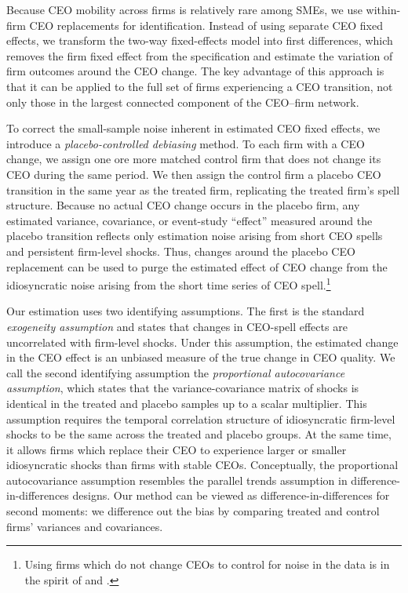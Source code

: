 \documentclass[sigconf,nonacm]{acmart}
\begin{document}
Because CEO mobility across firms is relatively rare among SMEs, we use within-firm CEO replacements for identification. Instead of using separate CEO fixed effects, we transform the two-way fixed-effects model into first differences, which removes the firm fixed effect from the specification and estimate the variation of firm outcomes around the CEO change. The key advantage of this approach is that it can be applied to the full set of firms experiencing a CEO transition, not only those in the largest connected component of the CEO–firm network.

To correct the small-sample noise inherent in estimated CEO fixed effects, we introduce a \textit{placebo-controlled debiasing} method. To each firm with a CEO change, we assign one ore more matched control firm that does not change its CEO during the same period. We then assign the control firm a placebo CEO transition in the same year as the treated firm, replicating the treated firm's spell structure. Because no actual CEO change occurs in the placebo firm, any estimated variance, covariance, or event-study ``effect'' measured around the placebo transition reflects only estimation noise arising from short CEO spells and persistent firm-level shocks. Thus, changes around the placebo CEO replacement can be used to purge the estimated effect of CEO change from the idiosyncratic noise arising from the short time series of CEO spell.\footnote{Using firms which do not change CEOs to control for noise in the data is in the spirit of \cite{fitza2014use} and \cite{jarosiewicz2023revisiting}.}

Our estimation uses two identifying assumptions. The first is the standard \textit{exogeneity assumption} and states that changes in CEO-spell effects are uncorrelated with firm-level shocks. Under this assumption, the estimated change in the CEO effect is an unbiased measure of the true change in CEO quality. We call the second identifying assumption the \textit{proportional autocovariance assumption}, which states that the variance-covariance matrix of shocks is identical in the treated and placebo samples up to a scalar multiplier. This assumption requires the temporal correlation structure of idiosyncratic firm-level shocks to be the same across the treated and placebo groups. At the same time, it allows firms which replace their CEO to experience larger or smaller idiosyncratic shocks than firms with stable CEOs. Conceptually, the proportional autocovariance assumption resembles the parallel trends assumption in difference-in-differences designs. Our method can be viewed as difference-in-differences for second moments: we difference out the bias by comparing treated and control firms' variances and covariances.
\end{document}
